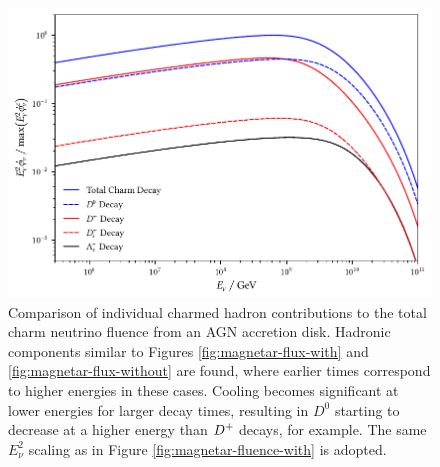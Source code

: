 \begin{figure}[H]
	\centering
	\includegraphics{../plots/build/nucleus_charm_decay_comparison.pdf}
	\caption[AGN accretion disk $\nu \kern+0.5pt$ fluence from $c$ decay.]
			{Comparison of individual charmed hadron contributions to the total charm neutrino fluence
			 from an AGN accretion disk. Hadronic components similar to Figures \ref{fig:magnetar-flux-with}
			 and \ref{fig:magnetar-flux-without} are found, where earlier times correspond to higher energies
			 in these cases. Cooling becomes significant at lower energies for larger decay times, resulting
			 in $D^0$ starting to decrease at a higher energy than $D^+ \kern-0.5pt$ decays, for example. The
			 same $E_\nu^2$ scaling as in Figure \ref{fig:magnetar-fluence-with} is adopted.}
	\label{fig:nucleus-charm-comparison}
\end{figure}
